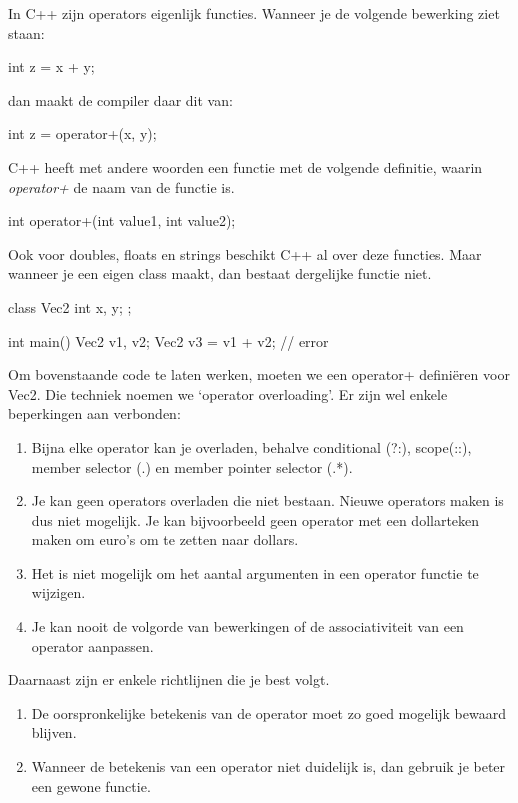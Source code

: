\documentclass[11pt, oldfontcommands, oneside, a4paper]{memoir}
\begin{document}
In C++ zijn operators eigenlijk functies. Wanneer je de volgende bewerking ziet staan:

\begin{code}
int z = x + y;
\end{code}

dan maakt de compiler daar dit van:

\begin{code}
int z = operator+(x, y);
\end{code}

C++ heeft met andere woorden een functie met de volgende definitie, waarin \textsl{operator+} de naam van de functie is.

\begin{code}
int operator+(int value1, int value2);
\end{code}

Ook voor doubles, floats en strings beschikt C++ al over deze functies. Maar wanneer je een eigen class maakt, dan bestaat dergelijke functie niet.

\begin{code}
class Vec2 {
  int x, y;
};

int main() {
  Vec2 v1, v2;
  Vec2 v3 = v1 + v2; // error
}
\end{code}

Om bovenstaande code te laten werken, moeten we een operator+ defini\"eren voor Vec2. Die techniek noemen we `operator overloading'. Er zijn wel enkele beperkingen aan verbonden:

\begin{enumerate}
  \item Bijna elke operator kan je overladen, behalve conditional (?:), scope(::), member selector (.) en member pointer selector (.*).
  \item Je kan geen operators overladen die niet bestaan. Nieuwe operators maken is dus niet mogelijk. Je kan bijvoorbeeld geen operator met een dollarteken maken om euro's om te zetten naar dollars.
  \item Het is niet mogelijk om het aantal argumenten in een operator functie te wijzigen. 
  \item Je kan nooit de volgorde van bewerkingen of de associativiteit van een operator aanpassen.
\end{enumerate}

Daarnaast zijn er enkele richtlijnen die je best volgt. 

\begin{enumerate}
  \item De oorspronkelijke betekenis van de operator moet zo goed mogelijk bewaard blijven. 
  \item Wanneer de betekenis van een operator niet duidelijk is, dan gebruik je beter een gewone functie.
\end{enumerate} 
\end{document}
